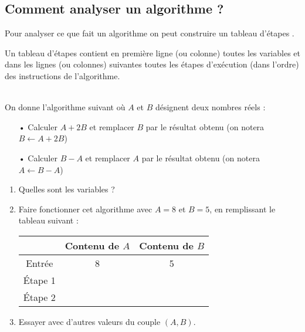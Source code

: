 \subsection{Comment analyser un algorithme ?}

Pour analyser ce que fait un algorithme on peut construire un \og tableau d'étapes \fg{}.

\begin{definition}
Un tableau d'étapes contient en première ligne (ou colonne) toutes les variables et dans  les lignes (ou colonnes) suivantes toutes les étapes d'exécution (dans l'ordre) des instructions de l'algorithme.
\end{definition}
\medskip

\begin{exemples}\\
	
On donne l'algorithme suivant où $ A $ et $ B $ désignent deux nombres réels :
\medskip

\begin{itemize}
\item[•] Calculer $A + 2B$ et remplacer $B$ par le résultat obtenu (on notera $B \gets A +  2B$)\medskip
\item[•] Calculer $B-A$ et remplacer $A$ par le résultat obtenu (on notera $A \gets B -A$)
\end{itemize}
\medskip

\begin{minipage}{8cm}
\begin{enumerate}
\item Quelles sont les variables ?\medskip
\item Faire fonctionner cet algorithme avec $A = 8$ et $B = 5$, en remplissant le tableau suivant :\medskip

{\renewcommand{\arraystretch}{1.3}
\begin{tabular}{|c|c|c|}
\cline{2-3} 
\multicolumn{1}{c|}{} & Contenu de $A$ & Contenu de $B$ \\ 
\hline 
Entrée & 8 & 5\\\hline 
Étape 1 & &\\\hline 
Étape 2 & &\\\hline 
\end{tabular}}

\end{enumerate}
\end{minipage}
\hspace{1mm}
\vline
\begin{minipage}{8cm}
\begin{enumerate}
\setcounter{enumi}{2}
\item Essayer avec d'autres valeurs du couple $(A, B)$.\medskip 


\end{enumerate}
\end{minipage}
\end{exemples}
